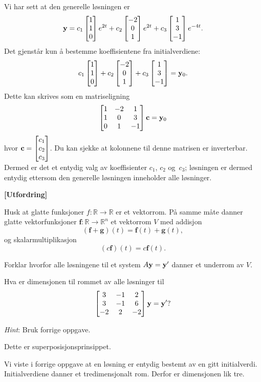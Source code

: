 \begin{losning}
Vi har sett at den generelle løsningen er 
$$\mathbf{y}=c_1\begin{bmatrix} 1 \\ 1 \\ 0 \end{bmatrix}e^{2t}+c_2\begin{bmatrix} -2 \\ 0 \\ 1 \end{bmatrix}e^{2t}+c_3\begin{bmatrix} 1 \\ 3 \\ -1 \end{bmatrix}e^{-4t}.$$ Det gjenstår kun å bestemme koeffisientene fra initialverdiene:
$$c_1\begin{bmatrix} 1 \\ 1 \\ 0 \end{bmatrix}+c_2\begin{bmatrix} -2 \\ 0 \\ 1 \end{bmatrix}+c_3\begin{bmatrix} 1 \\ 3 \\ -1 \end{bmatrix}=\mathbf{y}_0.$$ Dette kan skrives som en matriseligning
$$\begin{bmatrix}
1 & -2 & 1\\
1 & 0 & 3\\
0 & 1 & -1
\end{bmatrix} \mathbf{c}= \mathbf{y}_0$$ hvor $\mathbf{c}=\begin{bmatrix} c_1 \\ c_2 \\ c_3 \end{bmatrix}$. Du kan sjekke at kolonnene til denne matrisen er inverterbar. Dermed er det et entydig valg av koeffisienter $c_1$, $c_2$ og~$c_3$; løsningen er dermed entydig ettersom den generelle løsningen inneholder alle løsninger.
\end{losning}

\newpage
\begin{oppgave}\textbf{[Utfordring]}
	
\noindent
Husk at glatte funksjoner $f :\mathbb{R}\rightarrow \mathbb{R}$ er et vektorrom. På samme måte danner glatte vektorfunksjoner $\mathbf f:\mathbb{R}\rightarrow \mathbb{R}^n$ et vektorrom $V$ med addisjon
$$(\mathbf f + \mathbf g)(t)=\mathbf{f}(t)+\mathbf{g}(t),$$ og skalarmultiplikasjon
$$(c \mathbf f )(t)=c\mathbf{f}(t).$$

\begin{punkt}
Forklar hvorfor alle løsningene til et system $A\mathbf{y}=\mathbf{y}'$ danner et underrom av $V$.
\end{punkt}

\begin{punkt}
Hva er dimensjonen til rommet av alle løsninger til $$
\begin{bmatrix}
3 & -1 & 2\\
3 & -1 & 6\\
-2 & 2 & -2
\end{bmatrix} \mathbf{y}= \mathbf{y} ' ?$$

\noindent
\emph{Hint}: Bruk forrige oppgave.
\end{punkt}


\end{oppgave}





\begin{losning}
	\begin{punkt}
		Dette er superposisjonsprinsippet.
	\end{punkt}
	
	\begin{punkt}
	Vi viste i forrige oppgave at en løsning er entydig bestemt av en gitt initialverdi. Initialverdiene danner et tredimensjonalt rom. Derfor er dimensjonen lik tre.
	\end{punkt}
	
	
\end{losning}










